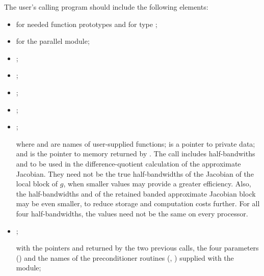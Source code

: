 The user's calling program should include the following elements:
\begin{itemize}
  
\item  {} 
  for needed function prototypes and for type ;
  
\item {} 
  for the parallel {\nvector} module;
  
\item  {};
  
\item  {};

\item  {};

\item  {};

\item  {}
  \newline\hspace*{1in};

  where  and  are names of user-supplied
  functions;  is a pointer to private data; and 
  is the pointer to {\cvodes} memory returned by .
  The  call includes half-bandwiths  and    
  to be used in the difference-quotient calculation of the    
  approximate Jacobian.  They need not be the true            
  half-bandwidths of the Jacobian of the local block of $g$,    
  when smaller values may provide a greater efficiency.       
  Also, the half-bandwidths  and  of the retained 
  banded approximate Jacobian block may be even smaller,      
  to reduce storage and computation costs further.            
  For all four half-bandwidths, the values need not be the    
  same on every processor.
  
\item  {}
  \newline\hspace*{1in}; 

  with the pointers  and  returned by the two previous calls,
  the four {\spgmr} parameters () and the
  names of the preconditioner routines (, )
  supplied with the {\cvbbdpre} module;
  

\end{itemize}
